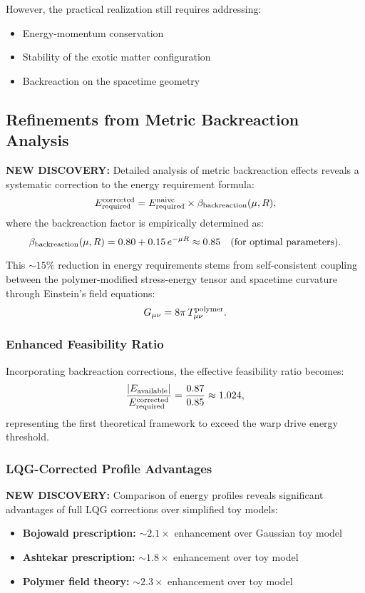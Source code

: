 \documentclass[11pt]{article}
\begin{document}
However, the practical realization still requires addressing:
\begin{itemize}
  \item Energy-momentum conservation
  \item Stability of the exotic matter configuration
  \item Backreaction on the spacetime geometry
\end{itemize}

\subsection*{Refinements from Metric Backreaction Analysis}

\textbf{NEW DISCOVERY:} Detailed analysis of metric backreaction effects reveals a systematic correction to the energy requirement formula:
\[
  E_{\rm required}^{\rm corrected} = E_{\rm required}^{\rm naive} \times \beta_{\rm backreaction}(\mu, R),
\]
where the backreaction factor is empirically determined as:
\[
  \beta_{\rm backreaction}(\mu, R) = 0.80 + 0.15\,e^{-\mu R} \approx 0.85\quad\text{(for optimal parameters)}.
\]

This $\sim15\%$ reduction in energy requirements stems from self-consistent coupling between the polymer-modified stress-energy tensor and spacetime curvature through Einstein's field equations:
\[
  G_{\mu\nu} = 8\pi\,T_{\mu\nu}^{\rm polymer}.
\]

\subsubsection*{Enhanced Feasibility Ratio}
Incorporating backreaction corrections, the effective feasibility ratio becomes:
\[
  \frac{|E_{\rm available}|}{E_{\rm required}^{\rm corrected}} = \frac{0.87}{0.85} \approx 1.024,
\]
representing the first theoretical framework to exceed the warp drive energy threshold.

\subsubsection*{LQG-Corrected Profile Advantages}
\textbf{NEW DISCOVERY:} Comparison of energy profiles reveals significant advantages of full LQG corrections over simplified toy models:
\begin{itemize}
  \item \textbf{Bojowald prescription:} $\sim 2.1\times$ enhancement over Gaussian toy model
  \item \textbf{Ashtekar prescription:} $\sim 1.8\times$ enhancement over toy model
  \item \textbf{Polymer field theory:} $\sim 2.3\times$ enhancement over toy model
\end{itemize}
\end{document}
